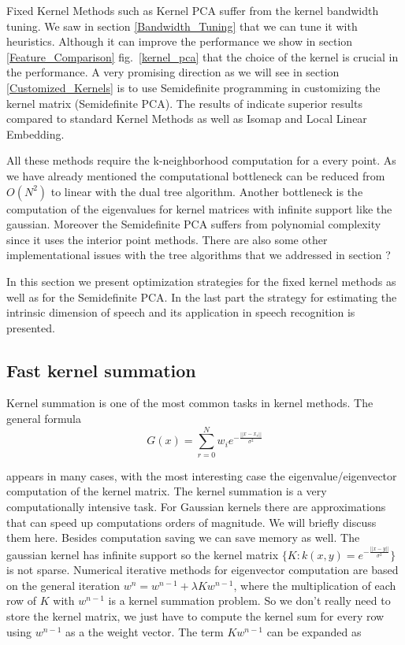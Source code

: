 \documentclass[12pt,letterpaper,doublespaced,ETD,dvips,proposal]{gtthesis}
\begin{document}
\begin{Body}
Fixed Kernel Methods such as Kernel PCA suffer from the kernel bandwidth tuning. 
We saw in section \ref{Bandwidth_Tuning}
that we can tune it with heuristics. Although it can improve the performance we show in 
section \ref{Feature_Comparison} fig.~\ref{kernel_pca} that the 
choice of the kernel is crucial in the performance. A very promising direction as we will see in 
section \ref{Customized_Kernels}
is to use Semidefinite programming in customizing the kernel matrix (Semidefinite PCA). The results of \cite{weinberger2004lkm}
indicate superior results compared to standard Kernel Methods as well as Isomap and Local Linear Embedding.

All these methods require the k-neighborhood computation for a every point. As we have already 
mentioned the computational bottleneck can be reduced from $O(N^2)$ to linear with the dual tree
algorithm. Another bottleneck is the computation of the eigenvalues for kernel matrices with
infinite support like the gaussian. Moreover the Semidefinite PCA suffers from polynomial complexity since it uses the interior
point methods. There are also some other implementational issues with the tree algorithms that we addressed
in section ?

In this section we present optimization strategies for the fixed kernel methods as well as for the
Semidefinite PCA. In the last part the strategy for estimating the intrinsic dimension of speech and its
application in speech recognition is presented.


\subsection{Fast kernel summation} 
Kernel summation is one of the most common tasks in kernel methods. The general formula
\begin{equation}
\label{kernel_sum}
  G(x)=\sum_{r=0}^{N} w_i e^{-\frac{||x-x_r||}{\sigma^2}}
\end{equation}

appears in many cases, with the most interesting case the
eigenvalue/eigenvector computation of the kernel matrix. The kernel summation is a very
computationally intensive task. For Gaussian kernels there are
approximations that can speed up computations orders of magnitude.
We will briefly discuss them here. Besides computation saving we can
save memory as well. The gaussian kernel has infinite support so the
kernel matrix $\{K : k(x,y)=e^{-\frac{||x-y||}{\sigma^2}} \}$ is not
sparse. Numerical iterative methods for eigenvector computation are
based on the general iteration $w^n=w^{n-1}+\lambda Kw^{n-1}$, where
the multiplication of each row of $K$ with $w^{n-1}$ is a kernel
summation problem. So we don't really need to store the kernel
matrix, we just have to compute the kernel sum for every row using
$w^{n-1}$ as a the weight vector. The term $Kw^{n-1}$ can be
expanded as


\end{Body}
\end{document}
